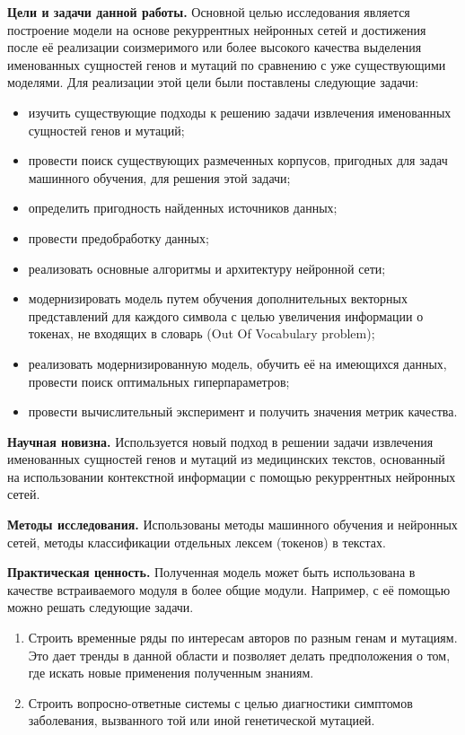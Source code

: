 \documentclass[12pt, a4paper]{article} %
\begin{document}
	 

\bigskip

\textbf{Цели и задачи данной работы.} Основной целью исследования является построение модели на основе рекуррентных нейронных сетей и достижения после её реализации соизмеримого или более высокого качества выделения именованных сущностей генов и мутаций по сравнению с уже существующими моделями. Для реализации этой цели были поставлены следующие задачи:
\begin{itemize}
	\item изучить существующие подходы к решению задачи извлечения именованных сущностей генов и мутаций;
	\item провести поиск существующих размеченных корпусов, пригодных для задач машинного обучения, для решения этой задачи;
	\item определить пригодность найденных источников данных;
	\item провести предобработку данных;
	\item реализовать основные алгоритмы и архитектуру нейронной сети;
	\item модернизировать модель путем обучения дополнительных векторных представлений для каждого символа с целью увеличения информации о токенах, не входящих в словарь (Out Of Vocabulary problem);
	\item реализовать модернизированную модель, обучить её на имеющихся данных, провести поиск оптимальных гиперпараметров;
	\item провести вычислительный эксперимент и получить значения метрик качества.
\end{itemize}

\bigskip

\textbf{Научная новизна.} Используется новый подход в решении задачи извлечения именованных сущностей генов и мутаций из медицинских текстов, основанный на использовании контекстной информации с помощью рекуррентных нейронных сетей.

\bigskip

\textbf{Методы исследования.} Использованы методы машинного обучения и нейронных сетей, методы классификации отдельных лексем (токенов) в текстах.

\bigskip

\textbf{Практическая ценность.} Полученная модель может быть использована в качестве встраиваемого модуля в более общие модули. Например, с её помощью можно решать следующие задачи.
\begin{enumerate}
	\item Строить временные ряды по интересам авторов по разным генам и мутациям. Это дает тренды в данной области и позволяет делать предположения о том, где искать новые применения полученным знаниям.
	\item Строить вопросно-ответные системы с целью диагностики симптомов заболевания, вызванного той или иной генетической мутацией.	
\end{enumerate}
\end{document}
